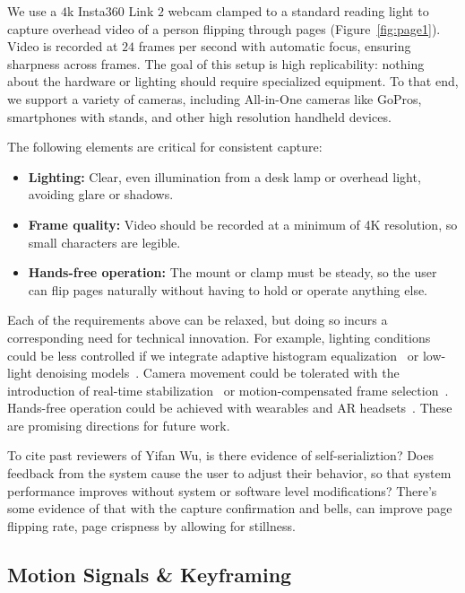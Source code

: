 We use a $4$k Insta360 Link $2$ webcam clamped to a standard reading light to capture overhead video of a person flipping through pages (Figure~\ref{fig:page1}). Video is recorded at $24$ frames per second with automatic focus, ensuring sharpness across frames. The goal of this setup is high replicability: nothing about the hardware or lighting should require specialized equipment. To that end, we support a variety of cameras, including All-in-One cameras like GoPros, smartphones with stands, and other high resolution handheld devices.

The following elements are critical for consistent capture:
\begin{itemize}
    \item \textbf{Lighting:} Clear, even illumination from a desk lamp or overhead light, avoiding glare or shadows.
    \item \textbf{Frame quality:} Video should be recorded at a minimum of 4K resolution, so small characters are legible. 
    \item \textbf{Hands-free operation:} The mount or clamp must be steady, so the user can flip pages naturally without having to hold or operate anything else.
\end{itemize}


Each of the requirements above can be relaxed, but doing so incurs a corresponding need for technical innovation. For example, lighting conditions could be less controlled if we integrate adaptive histogram equalization~\cite{pizer1987adaptive} or low-light denoising models~\cite{li2015low}. Camera movement could be tolerated with the introduction of real-time stabilization~\cite{castillo2004real} or motion-compensated frame selection~\cite{huang2009correlation}. Hands-free operation could be achieved with wearables and AR headsets~\cite{mann1997wearable, Meta2023RayBanMeta}. These are promising directions for future work.

To cite past reviewers of Yifan Wu, is there evidence of self-serializtion? Does feedback from the system cause the user to adjust their behavior, so that system performance improves without system or software level modifications? There's some evidence of that with the capture confirmation and bells, can improve page flipping rate, page crispness by allowing for stillness.

\subsection{Motion Signals \& Keyframing}


